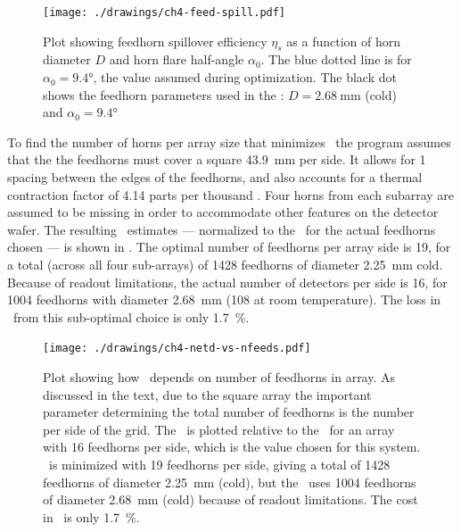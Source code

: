 \begin{figure}
\centering
\texttt{[image: ./drawings/ch4-feed-spill.pdf]}
\caption{
  Plot showing feedhorn spillover efficiency $\eta_s$ as a function of horn diameter $D$ and horn flare half-angle $\alpha_0$.
  The blue dotted line is for $\alpha_0 = \ang{9.4}$, the value assumed during optimization.
  The black dot shows the feedhorn parameters used in the \Imager: $D = \SI{2.68}{\mm}$ (cold) and $\alpha_0 = \ang{9.4}$
}
\label{fig:ch4-feed-spill}
\end{figure}

To find the number of horns per array size that minimizes \NETD\, the program assumes that the the feedhorns must cover a square \SI{43.9}{\mm} per side.
It allows for \SI{1}{\mil} spacing between the edges of the feedhorns, and also accounts for a thermal contraction factor of 4.14 parts per thousand \cite[Appendix~A6.4]{ekin_experimental_2006}.
Four horns from each subarray are assumed to be missing in order to accommodate other features on the detector wafer.
The resulting \NETD\ estimates --- normalized to the \NETD\ for the actual feedhorns chosen --- is shown in .
The optimal number of feedhorns per array side is 19, for a total (across all four sub-arrays) of 1428 feedhorns of diameter \SI{2.25}{\mm} cold.
Because of readout limitations, the actual number of detectors per side is 16, for 1004 feedhorns with diameter \SI{2.68}{\mm} (\SI{108}{\mils} at room temperature).
The loss in \NETD\ from this sub-optimal choice is only \SI{1.7}{\percent}.

\begin{figure}
\centering
\texttt{[image: ./drawings/ch4-netd-vs-nfeeds.pdf]}
\caption{
  Plot showing how \NETD\ depends on number of feedhorns in array.
  As discussed in the text, due to the square array the important parameter determining the total number of feedhorns is the number per side of the grid.
  The \NETD\ is plotted relative to the \NETD\ for an array with 16 feedhorns per side, which is the value chosen for this system.
  \NETD\ is minimized with 19 feedhorns per side, giving a total of 1428 feedhorns of diameter \SI{2.25}{\mm} (cold), but the \Imager\ uses 1004 feedhorns of diameter \SI{2.68}{\mm} (cold) because of readout limitations.
  The cost in \NETD\ is only \SI{1.7}{\percent}.
}
\label{fig:ch4-netd-vs-nfeeds}
\end{figure}


